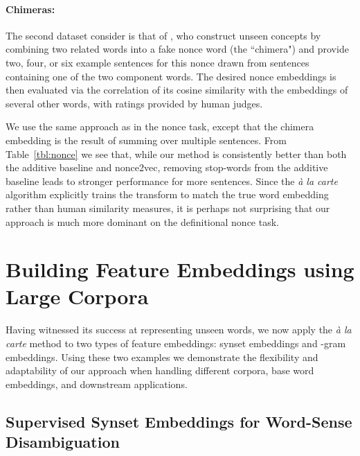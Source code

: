 \documentclass[11pt,a4paper]{article}
\begin{document}
\paragraph{Chimeras:} 
The second dataset \citet{Herbelot:17} consider is that of \citet{Lazaridou:17}, who construct unseen concepts by combining two related words into a fake nonce word (the ``chimera") and provide two, four, or six example sentences for this nonce drawn from sentences containing one of the two component words. 
The desired nonce embeddings is then evaluated via the correlation of its cosine similarity with the embeddings of several other words, with ratings provided by human judges.

We use the same approach as in the nonce task, except that the chimera embedding is the result of summing over multiple sentences.
From Table~\ref{tbl:nonce} we see that, while our method is consistently better than both the additive baseline and nonce2vec, removing stop-words from the additive baseline leads to stronger performance for more sentences.
Since the {\em\`a la carte} algorithm explicitly trains the transform to match the true word embedding rather than human similarity measures, it is perhaps not surprising that our approach is much more dominant on the definitional nonce task. 


\section{Building Feature Embeddings using Large Corpora}

Having witnessed its success at representing unseen words, we now apply the {\em\`a la carte} method to two types of feature embeddings: synset embeddings and -gram embeddings.
Using these two examples we demonstrate the flexibility and adaptability of our approach when handling different corpora, base word embeddings, and downstream applications.

\subsection{Supervised Synset Embeddings for Word-Sense Disambiguation}\label{subsec:wsd}
\end{document}
